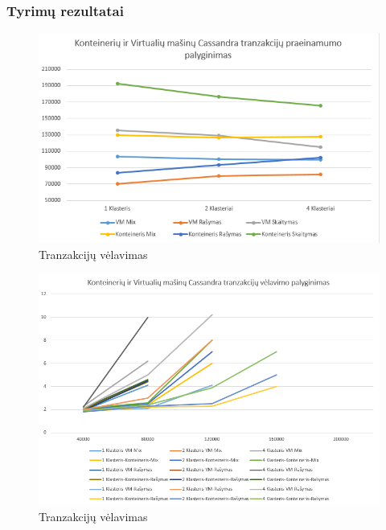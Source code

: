 \documentclass{VUMIFPSkursinis}
\begin{document}
	\subsubsection{Tyrimų rezultatai}
		\begin{figure}[H]
		    \centering
		    \includegraphics[scale=0.5]{img/CasTh}
		    \caption{Tranzakcijų vėlavimas}   %
		    \label{img:mlp}
		\end{figure}
		\begin{figure}[H]
		    \centering
		    \includegraphics[scale=0.5]{img/CasLat}
		    \caption{Tranzakcijų vėlavimas}   %
		    \label{img:mlp}
		\end{figure}
\end{document}
